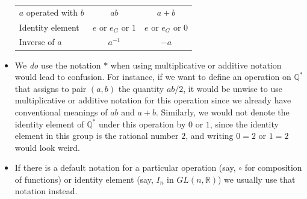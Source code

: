\documentclass[10pt,]{book}
\theoremstyle{plain}
\theoremstyle{definition}
\theoremstyle{definition}
\theoremstyle{definition}
\theoremstyle{definition}
\numberwithin{equation}{section}
\def\R{\mathbb{R}}
\def\Q{\mathbb{Q}}
\begin{document}
\begin{itemize}[label=\textbullet]
\begin{tabular}{lll}
\(a\) operated with \(b\)&\multicolumn{1}{c}{\(ab\)}&\multicolumn{1}{c}{\(a+b\)}\tabularnewline[0pt]
Identity element&\multicolumn{1}{c}{\(e\) or \(e_G\) or \(1\)}&\multicolumn{1}{c}{\(e\) or \(e_G\) or \(0\)}\tabularnewline[0pt]
Inverse of \(a\)&\multicolumn{1}{c}{\(a^{-1}\)}&\multicolumn{1}{c}{\(-a\)}
\end{tabular}
%
\item{}We \emph{do} use the notation \(*\) when using multiplicative or additive notation would lead to confusion. For instance, if we want to define an operation on \(\Q^*\) that assigns to pair \((a,b)\) the quantity \(ab/2\), it would be unwise to use multiplicative or additive notation for this operation since we already have conventional meanings of \(ab\) and \(a+b\). Similarly, we would not denote the identity element of \(\Q^*\) under this operation by \(0\) or \(1\), since the identity element in this group is the rational number \(2\), and writing \(0=2\) or \(1=2\) would look weird.%
\item{}If there is a default notation for a particular operation (say, \(\circ\) for composition of functions) or identity element (say, \(I_n\) in \(GL(n,\R)\)) we usually use that notation instead.%
\end{itemize}
%
\typeout{************************************************}
\typeout{************************************************}
\end{document}
